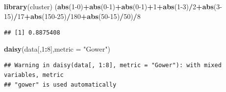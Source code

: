 \documentclass[
]{article}
\newenvironment{Shaded}{\begin{snugshade}}{\end{snugshade}}
\newcommand{\DataTypeTok}[1]{\textcolor[rgb]{0.13,0.29,0.53}{#1}}
\newcommand{\DecValTok}[1]{\textcolor[rgb]{0.00,0.00,0.81}{#1}}
\newcommand{\KeywordTok}[1]{\textcolor[rgb]{0.13,0.29,0.53}{\textbf{#1}}}
\newcommand{\NormalTok}[1]{#1}
\newcommand{\OperatorTok}[1]{\textcolor[rgb]{0.81,0.36,0.00}{\textbf{#1}}}
\newcommand{\StringTok}[1]{\textcolor[rgb]{0.31,0.60,0.02}{#1}}
\begin{document}
\begin{Shaded}
\begin{Highlighting}[]
\KeywordTok{library}\NormalTok{(cluster)}
\NormalTok{(}\KeywordTok{abs}\NormalTok{(}\DecValTok{1-0}\NormalTok{)}\OperatorTok{+}\KeywordTok{abs}\NormalTok{(}\DecValTok{0-1}\NormalTok{)}\OperatorTok{+}\KeywordTok{abs}\NormalTok{(}\DecValTok{0-1}\NormalTok{)}\OperatorTok{+}\DecValTok{1}\OperatorTok{+}\KeywordTok{abs}\NormalTok{(}\DecValTok{1-3}\NormalTok{)}\OperatorTok{/}\DecValTok{2}\OperatorTok{+}\KeywordTok{abs}\NormalTok{(}\DecValTok{3-15}\NormalTok{)}\OperatorTok{/}\DecValTok{17}\OperatorTok{+}\KeywordTok{abs}\NormalTok{(}\DecValTok{150-25}\NormalTok{)}\OperatorTok{/}\DecValTok{180}\OperatorTok{+}\KeywordTok{abs}\NormalTok{(}\DecValTok{50-15}\NormalTok{)}\OperatorTok{/}\DecValTok{50}\NormalTok{)}\OperatorTok{/}\DecValTok{8}
\end{Highlighting}
\end{Shaded}

\begin{verbatim}
## [1] 0.8875408
\end{verbatim}

\begin{Shaded}
\begin{Highlighting}[]
\KeywordTok{daisy}\NormalTok{(data[,}\DecValTok{1}\OperatorTok{:}\DecValTok{8}\NormalTok{],}\DataTypeTok{metric =} \StringTok{"Gower"}\NormalTok{) }
\end{Highlighting}
\end{Shaded}

\begin{verbatim}
## Warning in daisy(data[, 1:8], metric = "Gower"): with mixed variables, metric
## "gower" is used automatically
\end{verbatim}
\end{document}
